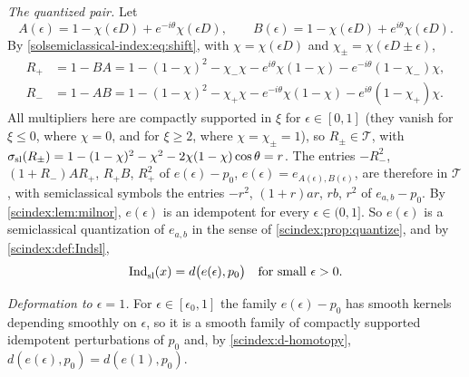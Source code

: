 \emph{The quantized pair.} Let
\begin{equation*}
  A(\epsilon)=1-\chi(\epsilon D)+e^{-i\theta}\chi(\epsilon D),\qquad
  B(\epsilon)=1-\chi(\epsilon D)+e^{i\theta}\chi(\epsilon D).
\end{equation*}
By \eqref{solsemiclassical-index:eq:shift}, with $\chi=\chi(\epsilon D)$ and
$\chi_\pm=\chi(\epsilon D\pm\epsilon)$,
\begin{align*}
  R_+&=1-BA=1-(1-\chi)^2-\chi_-\chi-e^{i\theta}\chi(1-\chi)-e^{-i\theta}(1-\chi_-)\chi,\\
  R_-&=1-AB=1-(1-\chi)^2-\chi_+\chi-e^{-i\theta}\chi(1-\chi)-e^{i\theta}(1-\chi_+)\chi .
\end{align*}
All multipliers here are compactly supported in $\xi$ for $\epsilon\in[0,1]$
(they vanish for $\xi\le0$, where $\chi=0$, and for $\xi\ge2$, where
$\chi=\chi_\pm=1$), so $R_\pm\in\mathcal T$, with $\sigma_{\mathrm{sl}}(R_\pm)=1-(1-\chi)^2-\chi^2-
2\chi(1-\chi)\cos\theta=r$. The entries $-R_-^2$, $(1+R_-)AR_+$, $R_+B$, $R_+^2$ of
$e(\epsilon)-p_0$, $e(\epsilon)=e_{A(\epsilon),B(\epsilon)}$, are therefore in
$\mathcal T$, with semiclassical symbols the entries $-r^2$, $(1+r)ar$, $rb$, $r^2$
of $e_{a,b}-p_0$. By \cref{scindex:lem:milnor}, $e(\epsilon)$ is an idempotent for
every $\epsilon\in(0,1]$. So $e(\epsilon)$ is a semiclassical quantization of
$e_{a,b}$ in the sense of \cref{scindex:prop:quantize}, and by
\cref{scindex:def:Indsl},
\begin{equation*}
  \operatorname{Ind}^{}_{\mathrm{sl}}(x)=d\bigl(e(\epsilon),p_0\bigr)\quad\text{for small }\epsilon>0.
\end{equation*}

\emph{Deformation to $\epsilon=1$.} For $\epsilon\in[\epsilon_0,1]$ the family
$e(\epsilon)-p_0$ has smooth kernels depending smoothly on $\epsilon$, so it is a
smooth family of compactly supported idempotent perturbations of $p_0$ and, by
\ref{scindex:d-homotopy}, $d(e(\epsilon),p_0)=d(e(1),p_0)$.

